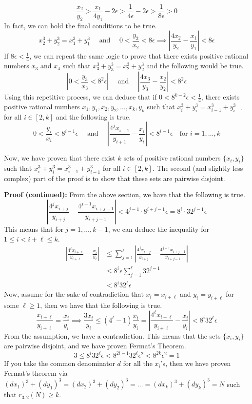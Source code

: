 \begin{boxedsection}
    $$
    \frac{x_2}{y_2} > \frac{x_1}{4y_1} - 2\epsilon > \frac{1}{4\epsilon} - 2\epsilon > \frac{1}{8\epsilon} > 0
    $$
    In fact, we can hold the final conditions to be true.
    $$
    x_2^3 + y_2^3 = x_1^3 + y_1^3 \quad \text{ and } \quad 0 < \frac{y_2}{x_2} < 8\epsilon \implies \left|\frac{4x_2}{y_2} - \frac{x_1}{y_1}\right| < 8\epsilon
    $$
    If $8\epsilon < \frac{1}{4}$, we can repeat the same logic to prove that there exists positive rational numbers $x_3$ and $x_4$ such that $x_3^3 + y_3^3 = x_2^3 + y_2^3$ and the following would be true.
    $$
    \left|0 < \frac{y_3}{x_3} < 8^2 \epsilon\right| \quad \text{ and } \quad \left|\frac{4x_3}{y_3} - \frac{x_2}{y_2}\right| < 8^2 \epsilon
    $$
    Using this repetitive process, we can deduce that if $0 < 8^{k-2}\epsilon < \frac{1}{4}$, there exists positive rational numbers $x_1, y_1, x_2, y_2, \dots, x_k , y_k$ such that $x_i^3 + y_i^3 = x_{i-1}^3 + y_{i-1}^3$ for all $i \in [2,k]$ and the following is true.
    $$
    0 < \frac{y_i}{x_i} < 8^{i-1}\epsilon \quad \text{ and } \quad \left|\frac{4^j x_{i+1}}{y_{i+1}} - \frac{x_i}{y_i}\right| < 8^{i-1}\epsilon \quad \text{for } i = 1,\dots,k
    $$
\end{boxedsection}
Now, we have proven that there exist $k$ sets of positive rational numbers $\{x_i, y_i\}$ such that $x_i^3 + y_i^3 = x_{i-1}^3 + y_{i-1}^3$ for all $i \in [2,k]$. The second (and slightly less complex) part of the proof is to show that these sets are pairwise disjoint. 
\begin{boxedsection}
\textbf{Proof (continued):} From the above section, we have that the following is true.
$$
\left| \frac{4^j x_{i+j}}{y_{i+j}} - \frac{4^{j-1}x_{i+j-1}}{y_{i+j-1}} \right| < 4^{j-1} \cdot 8^{i+j-1} \epsilon = 8^i \cdot 32^{j-1}\epsilon
$$
This means that for $j = 1, \dots, k-1$, we can deduce the inequality for $1 \leq i < i + \ell \leq k$.
\begin{align*}
\left| \frac{4^\ell x_{i+\ell}}{y_{i+\ell}}  - \frac{x_i}{y_i}\right| &\leq \sum_{j=1}^\ell \left| \frac{4^j x_{i+j}}{y_{i+j}} - \frac{4^{j-1}x_{i+j-1}}{y_{i+j-1}} \right|\\
&\leq 8^i\epsilon \sum_{j=1}^\ell 32^{j-1}\\
&< 8^i 32^\ell \epsilon
\end{align*}
Now, assume for the sake of contradiction that $x_i = x_{i+\ell}$ and $y_i = y_{i+\ell}$ for some $\ell \geq 1$, then we have that the following is true.
$$
\frac{x_{i+\ell}}{y_{i+\ell}} = \frac{x_i}{y_i} \implies \frac{3x_i}{y_i} \leq (4^\ell - 1)\frac{x_i}{y_i} = \left| \frac{4^\ell x_{i+\ell}}{y_{i+\ell}}  - \frac{x_i}{y_i}\right| < 8^i32^\ell \epsilon
$$
From the assumption, we have a contradiction. This means that the sets $\{x_i, y_i\}$ are pairwise disjoint, and we have proven Fermat's Theorem.
$$
3 \leq 8^i32^\ell \epsilon < 8^{2i-1}32^\ell \epsilon^2 < 8^{2k}\epsilon^2 = 1
$$
If you take the common denominator $d$ for all the $x_i$'s, then we have proven Fermat's theorem via $(dx_1)^3 + (dy_1)^3 = (dx_2)^3 + (dy_2)^3 = \dots = (dx_k)^3 + (dy_k)^3 = N$ such that $r_{3,2}(N) \geq k$.
\end{boxedsection}
